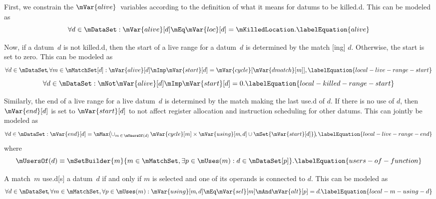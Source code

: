 First, we constrain the $\mVar{alive}$~\glspl{variable} according to the
definition of what it means for \glspl{datum} to be \gls{killed.d}.
%
This can be modeled as
%
\begin{equation}
  \forall d \in \mDataSet :
  \mVar{alive}[d]
  \mEq
  \mVar{loc}[d] = \mKilledLocation.
  \labelEquation{alive}
\end{equation}

Now, if a \gls{datum}~$d$ is not \gls{killed.d}, then the start of a \gls{live
  range} for a \gls{datum}~$d$ is determined by the \gls{match}
[ing] $d$\hspace{-.8pt}.
%
Otherwise, the start is set to zero.
%
This can be modeled as
%
\begin{equation}
  \forall d \in \mDataSet \!,
  \forall m \in \mMatchSet[d] :
  \mVar{alive}[d]
  \mImp
  \mVar{start}[d] = \mVar{cycle}[\mVar{dmatch}[m]],
  \labelEquation{local-live-range-start}
\end{equation}
%
\begin{equation}
  \forall d \in \mDataSet :
  \mNot\mVar{alive}[d]
  \mImp
  \mVar{start}[d] = 0.
  \labelEquation{local-killed-range-start}
\end{equation}

Similarly, the end of a \gls{live range} for a live \gls{datum}~$d$ is
determined by the \gls{match} making the last \gls{use.d} of $d$\hspace{-.8pt}.
%
If there is no use of $d$, then $\mVar{end}[d]$ is set to $\mVar{start}[d]$ to
not affect \gls{register allocation} and \gls{instruction scheduling} for other
\glspl{datum}.
%
This can jointly be modeled as
%
\begin{equation}
  \forall d \in \mDataSet :
  \mVar{end}[d] =
  \mMax\!
  \left(
    \cup_{m \,\in\, \mUsersOf(d)} \,
    \mVar{cycle}[m]
    \times
    \mVar{using}[m \hspace{-.8pt}, d]
    \cup
    \mSet{\mVar{start}[d]}
  \right)\!\!,
  \labelEquation{local-live-range-end}
\end{equation}
%
where
%
\begin{equation}
  \mUsersOf(d)
  \equiv
  \mSetBuilder{m}%
              {
                m \in \mMatchSet,
                \exists p \in \mUses(m) :
                d \in \mDataSet[p]
              }.
  \labelEquation{users-of-function}
\end{equation}

A \gls{match}~$m$ \gls{use.d}[s] a \gls{datum}~$d$ if and only if $m$ is
selected and one of its \glspl{operand} is connected to $d$\hspace{-.8pt}.
%
This can be modeled as
%
\begin{equation}
  \forall d \in \mDataSet \!,
  \forall m \in \mMatchSet,
  \forall p \in \mUses(m) :
  \mVar{using}[m \hspace{-.8pt}, d]
  \mEq
  \mVar{sel}[m] \mAnd \mVar{alt}[p] = d \hspace{-.8pt}.
  \labelEquation{local-m-using-d}
\end{equation}

